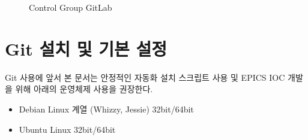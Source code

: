 \documentclass[11pt
  , a4paper
  , article
  , oneside
]{memoir}
\begin{document}
\begin{figure}[!htb]
	\centering
	\hfill
	\caption{Control Group GitLab}
	\label{fig:gitlab}
\end{figure}
\clearpage

\section{Git 설치 및 기본 설정}
Git 사용에 앞서 본 문서는 안정적인 자동화 설치 스크립트 사용 및 EPICS IOC 개발을 위해 아래의 운영체제 사용을 권장한다.
\begin{itemize}
	\item Debian Linux 계열 (Whizzy, Jessie) 32bit/64bit
	\item Ubuntu Linux 32bit/64bit
\end{itemize}
\end{document}
